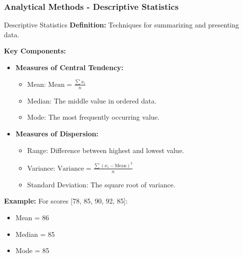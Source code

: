 \documentclass{beamer}
\begin{document}
\begin{frame}[fragile]
    \frametitle{Analytical Methods - Descriptive Statistics}
    \begin{block}{Descriptive Statistics}
        \textbf{Definition:} Techniques for summarizing and presenting data.

        \textbf{Key Components:}
        \begin{itemize}
            \item \textbf{Measures of Central Tendency:}
            \begin{itemize}
                \item Mean: \( \text{Mean} = \frac{\sum{x_i}}{n} \)
                \item Median: The middle value in ordered data.
                \item Mode: The most frequently occurring value.
            \end{itemize}
            
            \item \textbf{Measures of Dispersion:}
            \begin{itemize}
                \item Range: Difference between highest and lowest value.
                \item Variance: \( \text{Variance} = \frac{\sum{(x_i - \text{Mean})^2}}{n} \)
                \item Standard Deviation: The square root of variance.
            \end{itemize}
        \end{itemize}
        
        \textbf{Example:} For scores [78, 85, 90, 92, 85]:
        \begin{itemize}
            \item Mean = 86
            \item Median = 85
            \item Mode = 85
        \end{itemize}
    \end{block}
\end{frame}
\end{document}

